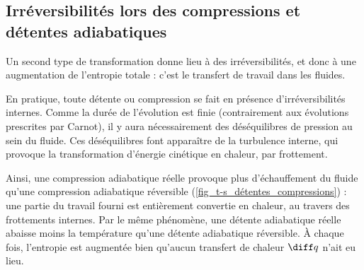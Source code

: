 		\onlyamphibook{\dontbreakpage}%

	\subsection{Irréversibilités lors des compressions et détentes adiabatiques}

		Un second type de transformation donne lieu à des irréversibilités, et donc à une augmentation de l’entropie totale : c’est le transfert de travail dans les fluides.

		En pratique, toute détente ou compression se fait en présence d’irréversibilités internes. Comme la durée de l’évolution est finie (contrairement aux évolutions prescrites par Carnot), il y aura nécessairement des déséquilibres de pression au sein du fluide. Ces déséquilibres font apparaître de la turbulence interne, qui provoque la transformation d’énergie cinétique en chaleur, par frottement.

		Ainsi, une compression adiabatique réelle provoque plus d’échauffement du fluide qu’une compression adiabatique réversible (\cref{fig_t-s_détentes_compressions}) : une partie du travail fourni est entièrement convertie en chaleur, au travers des frottements internes. Par le même phénomène, une détente adiabatique réelle abaisse moins la température qu’une détente adiabatique réversible. À chaque fois, l’entropie est augmentée bien qu’aucun transfert de chaleur $\diff q$ n’ait eu lieu.
		

